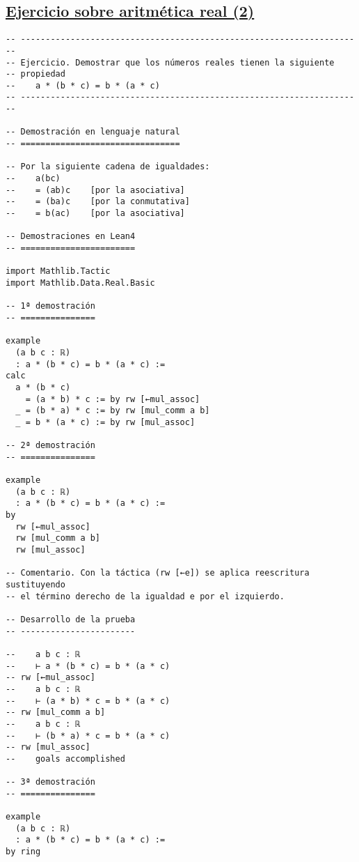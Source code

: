 \subsection{\href{./src/Basicos/Ejercicio\_sobre\_aritmetica\_real\_2.lean}{Ejercicio sobre aritmética real (2)}}
\label{sec:orge4cd5af}
\begin{verbatim}
-- ---------------------------------------------------------------------
-- Ejercicio. Demostrar que los números reales tienen la siguiente
-- propiedad
--    a * (b * c) = b * (a * c)
-- ---------------------------------------------------------------------

-- Demostración en lenguaje natural
-- ================================

-- Por la siguiente cadena de igualdades:
--    a(bc)
--    = (ab)c    [por la asociativa]
--    = (ba)c    [por la conmutativa]
--    = b(ac)    [por la asociativa]

-- Demostraciones en Lean4
-- =======================

import Mathlib.Tactic
import Mathlib.Data.Real.Basic

-- 1ª demostración
-- ===============

example
  (a b c : ℝ)
  : a * (b * c) = b * (a * c) :=
calc
  a * (b * c)
    = (a * b) * c := by rw [←mul_assoc]
  _ = (b * a) * c := by rw [mul_comm a b]
  _ = b * (a * c) := by rw [mul_assoc]

-- 2ª demostración
-- ===============

example
  (a b c : ℝ)
  : a * (b * c) = b * (a * c) :=
by
  rw [←mul_assoc]
  rw [mul_comm a b]
  rw [mul_assoc]

-- Comentario. Con la táctica (rw [←e]) se aplica reescritura sustituyendo
-- el término derecho de la igualdad e por el izquierdo.

-- Desarrollo de la prueba
-- -----------------------

--    a b c : ℝ
--    ⊢ a * (b * c) = b * (a * c)
-- rw [←mul_assoc]
--    a b c : ℝ
--    ⊢ (a * b) * c = b * (a * c)
-- rw [mul_comm a b]
--    a b c : ℝ
--    ⊢ (b * a) * c = b * (a * c)
-- rw [mul_assoc]
--    goals accomplished

-- 3ª demostración
-- ===============

example
  (a b c : ℝ)
  : a * (b * c) = b * (a * c) :=
by ring
\end{verbatim}

